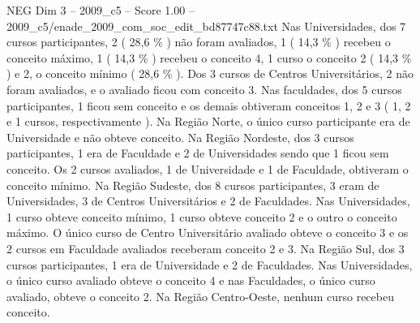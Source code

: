 \begin{textsample}{NEG Dim 3 – 2009\_c5 – Score 1.00 – 2009\_c5/enade\_2009\_com\_soc\_edit\_bd87747c88.txt}
Nas Universidades, dos 7 cursos participantes, 2 ( 28,6 \% ) não foram avaliados, 1 ( 14,3 \% ) recebeu o conceito máximo, 1 ( 14,3 \% ) recebeu o conceito 4, 1 curso o conceito 2 ( 14,3 \% ) e 2, o conceito mínimo ( 28,6 \% ).
Dos 3 cursos de Centros Universitários, 2 não foram avaliados, e o avaliado ficou com conceito 3.
Nas faculdades, dos 5 cursos participantes, 1 ficou sem conceito e os demais obtiveram conceitos 1, 2 e 3 ( 1, 2 e 1 cursos, respectivamente ).
Na Região Norte, o único curso participante era de Universidade e não obteve conceito.
Na Região Nordeste, dos 3 cursos participantes, 1 era de Faculdade e 2 de Universidades sendo que 1 ficou sem conceito.
Os 2 cursos avaliados, 1 de Universidade e 1 de Faculdade, obtiveram o conceito mínimo.
Na Região Sudeste, dos 8 cursos participantes, 3 eram de Universidades, 3 de Centros Universitários e 2 de Faculdades.
Nas Universidades, 1 curso obteve conceito mínimo, 1 curso obteve conceito 2 e o outro o conceito máximo.
O único curso de Centro Universitário avaliado obteve o conceito 3 e os 2 cursos em Faculdade avaliados receberam conceito 2 e 3.
Na Região Sul, dos 3 cursos participantes, 1 era de Universidade e 2 de Faculdades.
Nas Universidades, o único curso avaliado obteve o conceito 4 e nas Faculdades, o único curso avaliado, obteve o conceito 2.
Na Região Centro-Oeste, nenhum curso recebeu conceito.

\end{textsample}
